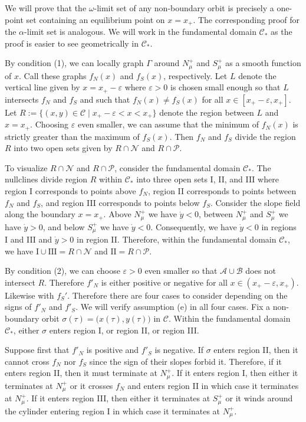 \documentclass[11 pt]{article}
\renewcommand\({\left(}
\renewcommand\){\right)}
\newcommand\e{\varepsilon}
\newcommand\<{\langle}
\renewcommand\>{\rangle}
\newcommand\8{\infty}
\renewcommand\a{\alpha}
\newcommand{\mc}{\mathcal}
\begin{document}
\proof
We will prove that the $\omega$-limit set of any non-boundary orbit is precisely a one-point set containing an equilibrium point on $x = x_+$. The corresponding proof for the $\a$-limit set is analogous. We will work in the fundamental domain $\mc{C}_*$ as the proof is easier to see geometrically in $\mc{C}_*$.

By condition (1), we can locally graph $\Gamma$ around $N^+_\mu$ and $S^+_\mu$ as a smooth function of $x$. Call these graphs $f_N(x)$ and $f_S(x)$, respectively. Let $L$ denote the vertical line given by $x = x_+ - \e$ where $\e > 0$ is chosen small enough so that $L$ intersects $f_N$ and $f_S$ and such that $f_N(x) \neq f_S(x)$ for all $x \in [x_+ - \e, x_+]$. Let $R := \{(x,y) \in \mc{C} \mid x_+ - \e < x < x_+\}$ denote the region between $L$ and $x = x_+$. Choosing $\e$ even smaller, we can assume that the minimum of $f_N(x)$ is strictly greater than the maximum of $f_S(x)$. Then $f_N$ and $f_S$ divide the region $R$ into two open sets given by $R \cap \mc{N}$ and $R \cap \mc{P}$.

To visualize $R \cap \mc{N}$ and $R \cap \mc{P}$, consider the fundamental domain $\mc{C}_*$. The nullclines divide region $R$ within $\mc{C}_*$ into three open sets I, II, and III where region I corresponds to points above $f_N$, region II corresponds to points between $f_N$ and $f_S$, and region III corresponds to points below $f_S$. Consider the slope field along the boundary $x = x_+$. Above $N^+_\mu$ we have $\dot{y} < 0$, between $N^+_\mu$ and $S^+_\mu$ we have $\dot{y} > 0$, and below $S^+_\mu$ we have $\dot{y} < 0$. Consequently, we have $\dot{y} < 0$ in regions I and III and $\dot{y} > 0$ in region II. Therefore, within the fundamental domain $\mc{C}_*$, we have $\text{I} \cup \text{III} = R \cap \mc{N}$ and $\text{II} = R \cap \mc{P}$.

 
 By condition (2), we can choose $\e > 0$ even smaller so that $\mc{A} \cup \mc{B}$ does not intersect $R$. Therefore $f'_N$ is either positive or negative for all $x \in (x_+ -\e, x_+)$. Likewise with $f_S'$. Therefore there are four cases to consider depending on the signs of $f'_N$ and $f'_S$. We will verify assumption (e) in all four cases. Fix a non-boundary orbit $\sigma(\tau) = \big(x(\tau), y(\tau)\big)$ in $\mc{C}$. Within the fundamental domain $\mc{C}_*$, either $\sigma$ enters region I, or region II, or region III. 
 
Suppose first that $f'_N$ is positive and $f'_S$ is negative. If $\sigma$ enters region II, then it cannot cross $f_N$ nor $f_S$ since the sign of their slopes forbid it. Therefore, if it enters region II, then it must terminate at $N^+_\mu$. If it enters region I, then either it terminates at $N^+_\mu$ or it crosses $f_N$ and enters region II in which case it terminates at $N^+_\mu$. If it enters region III, then either it terminates at $S^+_\mu$ or it winds around the cylinder entering region I in which case it terminates at $N^+_\mu$. 
 
\end{document}
